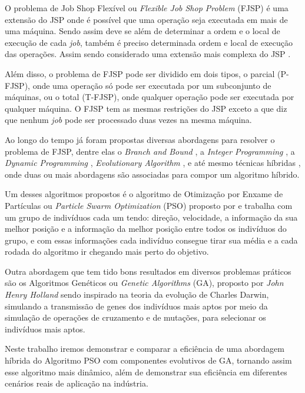     O problema de Job Shop Flexível ou \textit{Flexible Job Shop Problem} (FJSP) é uma extensão do JSP onde é possível que uma operação seja executada em mais de uma máquina. Sendo assim deve se além de determinar a ordem e o local de execução de cada \textit{job}, também é preciso determinada ordem e local de execução das operações. Assim sendo considerado uma extensão mais complexa do JSP \cite{Jansen2000}. \newline

    Além disso, o problema de FJSP pode ser dividido em dois tipos, o parcial (P-FJSP), onde uma operação só pode ser executada por um subconjunto de máquinas, ou o total (T-FJSP), onde qualquer operação pode ser executada por qualquer máquina. O FJSP tem as mesmas restrições do JSP exceto a que diz que nenhum \textit{job} pode ser processado duas vezes na mesma máquina. \newline

    Ao longo do tempo já foram propostas diversas abordagens para resolver o problema de FJSP, dentre elas o \textit{Branch and Bound} \cite{Nababan2008}, a 
    \textit{Integer Programming} \cite{Pan2007}, a 
    \textit{Dynamic Programming} \cite{Gromicho2012}, 
    \textit{Evolutionary Algorithm} \cite{Pezzella2008}, e até mesmo técnicas híbridas \cite{Zhang2009}, onde duas ou mais abordagens são associadas para compor um algoritmo híbrido. \newline

    Um desses algoritmos propostos é o algoritmo de Otimização por Enxame de Partículas ou \textit{Particle Swarm Optimization} (PSO) proposto por \cite{Kennedy1995} e trabalha com um grupo de indivíduos cada um tendo: direção, velocidade, a informação da sua melhor posição e a informação da melhor posição entre todos os indivíduos do grupo, e com essas informações cada indivíduo consegue tirar sua média e a cada rodada do algoritmo ir chegando mais perto do objetivo. \newline

    Outra abordagem que tem tido bons resultados em diversos problemas práticos \cite{Qing2012} são os Algoritmos Genéticos ou \textit{Genetic Algorithms} (GA), proposto por \textit{John Henry Holland} sendo inspirado na teoria da evolução de Charles Darwin, simulando a transmissão de genes dos indivíduos mais aptos por meio da simulação de operações de cruzamento e de mutações, para selecionar os indivíduos mais aptos. \newline

    Neste trabalho iremos demonstrar e comparar a eficiência de uma abordagem híbrida do Algoritmo PSO com componentes evolutivos de GA, tornando assim esse algoritmo mais dinâmico, além de demonstrar sua eficiência em diferentes cenários reais de aplicação na indústria.\newline


